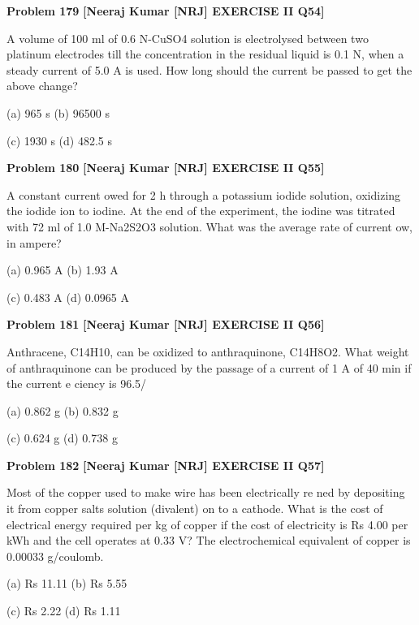 \begin{problembox}
\textbf{Problem 179} \hfill \textbf{[Neeraj Kumar [NRJ] EXERCISE II Q54]}
\label{q:ext-nrj_all_questions-179}

A volume of 100 ml of 0.6 N-CuSO4 solution is 
electrolysed between two platinum electrodes till the 
concentration in the residual liquid is 0.1 N, when 
a steady current of 5.0 A is used. How long should 
the current be passed to get the above change?
 
 (a) 965 s 
(b) 96500 s
 
 (c) 1930 s 
(d) 482.5 s
\end{problembox}

\begin{problembox}
\textbf{Problem 180} \hfill \textbf{[Neeraj Kumar [NRJ] EXERCISE II Q55]}
\label{q:ext-nrj_all_questions-180}

A constant current   owed for 2 h through a 
potassium iodide solution, oxidizing the iodide 
ion to iodine. At the end of the experiment, the 
iodine was titrated with 72 ml of 1.0 M-Na2S2O3 
solution. What was the average rate of current 
  ow, in ampere?
 
 (a) 0.965 A 
(b) 1.93 A
 
 (c) 0.483 A 
(d) 0.0965 A
\end{problembox}

\begin{problembox}
\textbf{Problem 181} \hfill \textbf{[Neeraj Kumar [NRJ] EXERCISE II Q56]}
\label{q:ext-nrj_all_questions-181}

Anthracene, 
C14H10, 
can 
be 
oxidized 
to 
anthraquinone, 
C14H8O2. 
What 
weight 
of 
anthraquinone can be produced by the passage of 
a current of 1 A of 40 min if the current e   ciency 
is 96.5/%
 
 (a) 0.862 g 
(b) 0.832 g
 
 (c) 0.624 g 
(d) 0.738 g
\end{problembox}

\begin{problembox}
\textbf{Problem 182} \hfill \textbf{[Neeraj Kumar [NRJ] EXERCISE II Q57]}
\label{q:ext-nrj_all_questions-182}

Most of the copper used to make wire has been 
electrically re  ned by depositing it from copper 
salts solution (divalent) on to a cathode. What 
is the cost of electrical energy required per kg of 
copper if the cost of electricity is Rs 4.00 per kWh 
and the cell operates at 0.33 V? The electrochemical 
equivalent of copper is 0.00033 g/coulomb.
 
 (a) Rs 11.11 
(b) Rs 5.55
 
 (c) Rs 2.22 
(d) Rs 1.11
\end{problembox}

